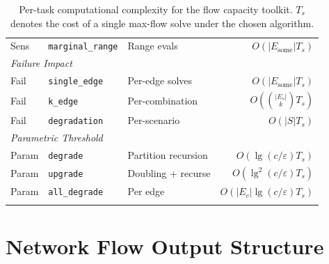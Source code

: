 \documentclass[12pt]{report}
\begin{document}
\begin{longtable}{l l l r}
Sens & \texttt{marginal\_range} & Range evals & $O(|E_{\text{some}}| T_s)$ \\[2pt]
\multicolumn{4}{l}{\small\textit{Failure Impact}} \\
Fail & \texttt{single\_edge} & Per-edge solves & $O(|E_{\text{some}}| T_s)$ \\
Fail & \texttt{k\_edge} & Per-combination & $O(\binom{|E_s|}{k} T_s)$\footnotemark[3] \\
Fail & \texttt{degradation} & Per-scenario & $O(|S| T_s)$ \\[2pt]
\multicolumn{4}{l}{\small\textit{Parametric Threshold}} \\
Param & \texttt{degrade} & Partition recursion & $O(\lg(c/\varepsilon) T_s)$ \\
Param & \texttt{upgrade} & Doubling + recurse & $O(\lg^2(c/\varepsilon) T_s)$ \\
Param & \texttt{all\_degrade} & Per edge & $O(|E_c| \lg(c/\varepsilon) T_s)$ \\[2pt]
\caption{Per-task computational complexity for the flow capacity toolkit. $T_s$ denotes the cost of a single max-flow solve under the chosen algorithm.}
\label{tab:flowcap_complexity}
\end{longtable}

\section{Network Flow Output Structure}
\end{document}

